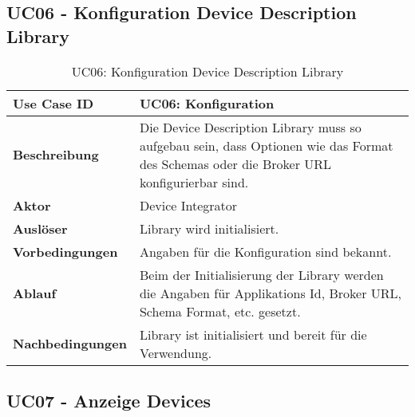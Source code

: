\subsection{UC06 - Konfiguration Device Description Library}
\begin{table}[H]
\begin{tabularx}{\textwidth}{|l|X|}

 \hline
 {\bf Use Case ID }    & UC06: Konfiguration \\  \hline
 {\bf Beschreibung }   & Die Device Description Library muss so aufgebau sein, dass Optionen wie das Format des Schemas oder die Broker URL konfigurierbar sind.  \\ \hline
 {\bf Aktor }          & Device Integrator \\ \hline
 {\bf Auslöser }       & Library wird initialisiert. \\ \hline
 {\bf Vorbedingungen } & Angaben für die Konfiguration sind bekannt. \\ \hline
 {\bf Ablauf }         & Beim der Initialisierung der Library werden die Angaben für Applikations Id, Broker URL, Schema Format, etc. gesetzt. \\ \hline
 {\bf Nachbedingungen} & Library ist initialisiert und bereit für die Verwendung. \\ \hline
  
\end{tabularx}
\caption{UC06: Konfiguration Device Description Library}
\end{table}

\subsection{UC07 - Anzeige Devices}

